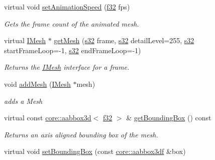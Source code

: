 \begin{DoxyCompactItemize}
virtual void \hyperlink{structirr_1_1scene_1_1SAnimatedMesh_ae7a32638fe5c59007d044bbc3c170108}{set\+Animation\+Speed} (\hyperlink{namespaceirr_a0277be98d67dc26ff93b1a6a1d086b07}{f32} fps)
\begin{DoxyCompactList}\small\item\em Gets the frame count of the animated mesh. \end{DoxyCompactList}\item 
virtual \hyperlink{classirr_1_1scene_1_1IMesh}{I\+Mesh} $\ast$ \hyperlink{structirr_1_1scene_1_1SAnimatedMesh_a132d5f643fe02b57480d945e8d5be2d2}{get\+Mesh} (\hyperlink{namespaceirr_ac66849b7a6ed16e30ebede579f9b47c6}{s32} frame, \hyperlink{namespaceirr_ac66849b7a6ed16e30ebede579f9b47c6}{s32} detail\+Level=255, \hyperlink{namespaceirr_ac66849b7a6ed16e30ebede579f9b47c6}{s32} start\+Frame\+Loop=-\/1, \hyperlink{namespaceirr_ac66849b7a6ed16e30ebede579f9b47c6}{s32} end\+Frame\+Loop=-\/1)
\begin{DoxyCompactList}\small\item\em Returns the \hyperlink{classirr_1_1scene_1_1IMesh}{I\+Mesh} interface for a frame. \end{DoxyCompactList}\item 
\mbox{\label{structirr_1_1scene_1_1SAnimatedMesh_a45bacd8ae07d47db3a204d3fd8d8bc50}} 
void \hyperlink{structirr_1_1scene_1_1SAnimatedMesh_a45bacd8ae07d47db3a204d3fd8d8bc50}{add\+Mesh} (\hyperlink{classirr_1_1scene_1_1IMesh}{I\+Mesh} $\ast$mesh)
\begin{DoxyCompactList}\small\item\em adds a Mesh \end{DoxyCompactList}\item 
virtual const \hyperlink{classirr_1_1core_1_1aabbox3d}{core\+::aabbox3d}$<$ \hyperlink{namespaceirr_a0277be98d67dc26ff93b1a6a1d086b07}{f32} $>$ \& \hyperlink{structirr_1_1scene_1_1SAnimatedMesh_a1494406ce8f11d47fd1e3b4af825e88f}{get\+Bounding\+Box} () const
\begin{DoxyCompactList}\small\item\em Returns an axis aligned bounding box of the mesh. \end{DoxyCompactList}\item 
\mbox{\label{structirr_1_1scene_1_1SAnimatedMesh_ab33614f8ef158c79260d555f69055bf5}} 
virtual void \hyperlink{structirr_1_1scene_1_1SAnimatedMesh_ab33614f8ef158c79260d555f69055bf5}{set\+Bounding\+Box} (const \hyperlink{namespaceirr_1_1core_a60f4b4c744aba55f10530d503c6ecb04}{core\+::aabbox3df} \&box)

\end{DoxyCompactItemize}

